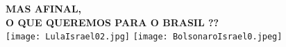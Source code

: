 \documentclass[aspectratio=169]{beamer}
\begin{document}
	
		\begin{frame}
	  \frametitle{}
	  \framesubtitle{}
\begin{center}
{\LARGE \textbf{MAS AFINAL,}}\\
{\LARGE \textbf{O QUE QUEREMOS PARA O BRASIL ??}}\\
  \vspace{1cm}
	  	  \texttt{[image: LulaIsrael02.jpg]}
	  	  \texttt{[image: BolsonaroIsrael0.jpeg]}
	  \end{center}
	\end{frame}
	
	
	
	

\end{document}
